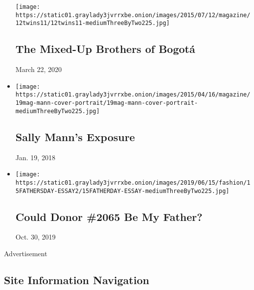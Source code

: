 \begin{itemize}
  \texttt{[image: https://static01.graylady3jvrrxbe.onion/images/2015/07/12/magazine/12twins11/12twins11-mediumThreeByTwo225.jpg]}

  \hypertarget{the-mixed-up-brothers-of-bogotuxe1}{%
  \subsection{The Mixed-Up Brothers of
  Bogotá}\label{the-mixed-up-brothers-of-bogotuxe1}}

  March 22, 2020
\item
  \href{https://www.nytimes3xbfgragh.onion/2015/04/19/magazine/the-cost-of-sally-manns-exposure.html}{}

  \texttt{[image: https://static01.graylady3jvrrxbe.onion/images/2015/04/16/magazine/19mag-mann-cover-portrait/19mag-mann-cover-portrait-mediumThreeByTwo225.jpg]}

  \hypertarget{sally-manns-exposure}{%
  \subsection{Sally Mann's Exposure}\label{sally-manns-exposure}}

  Jan. 19, 2018
\item
  \href{https://www.nytimes3xbfgragh.onion/2019/06/15/style/sperm-donation-fathers-day.html}{}

  \texttt{[image: https://static01.graylady3jvrrxbe.onion/images/2019/06/15/fashion/15FATHERSDAY-ESSAY2/15FATHERDAY-ESSAY-mediumThreeByTwo225.jpg]}

  \hypertarget{could-donor-2065-be-my-father}{%
  \subsection{Could Donor \#2065 Be My
  Father?}\label{could-donor-2065-be-my-father}}

  Oct. 30, 2019
\end{itemize}

Advertisement

\hypertarget{site-information-navigation}{%
\subsection{Site Information
Navigation}\label{site-information-navigation}}

